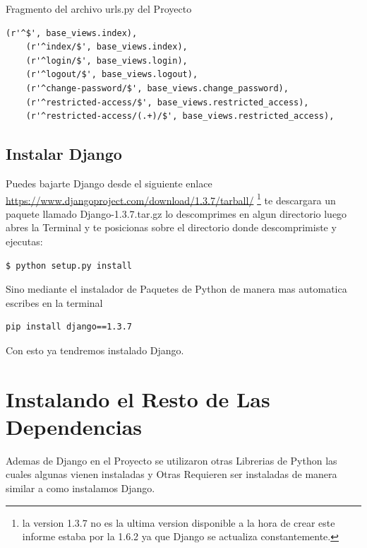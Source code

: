 Fragmento del archivo urls.py del Proyecto\\[0.1cm]

\begin{lstlisting}[style=HTML]
    (r'^$', base_views.index),
    (r'^index/$', base_views.index),
    (r'^login/$', base_views.login),
    (r'^logout/$', base_views.logout),
    (r'^change-password/$', base_views.change_password),
    (r'^restricted-access/$', base_views.restricted_access),
    (r'^restricted-access/(.+)/$', base_views.restricted_access),
\end{lstlisting}

\vspace{0.1cm}


\subsection{Instalar Django}

Puedes bajarte Django desde el siguiente enlace \url{https://www.djangoproject.com/download/1.3.7/tarball/}
\footnote {la version 1.3.7 no es la ultima version disponible a la hora de crear
este informe estaba por la 1.6.2 ya que Django se actualiza constantemente.}
te descargara un paquete llamado Django-1.3.7.tar.gz lo descomprimes en
algun directorio luego abres la Terminal y te posicionas sobre el directorio
donde descomprimiste y ejecutas:

\begin{lstlisting}[style=consola]
    $ python setup.py install 
\end{lstlisting}
\vspace{0.1cm}

Sino mediante el instalador de Paquetes de Python de manera mas automatica escribes
en la terminal

\begin{lstlisting}[style=consola]
     pip install django==1.3.7
\end{lstlisting}
\vspace{0.1cm}

Con esto ya tendremos instalado Django.

\section{Instalando el Resto de Las Dependencias}

Ademas de Django en el Proyecto se utilizaron otras Librerias de Python las cuales
algunas vienen instaladas y Otras Requieren ser instaladas de manera similar
a como instalamos Django.

